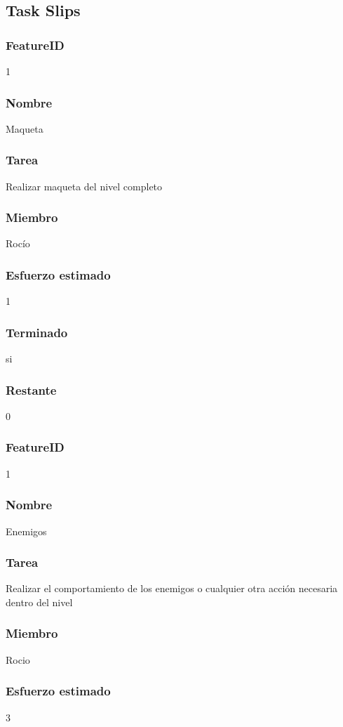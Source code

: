 \subsection{Task Slips}


\subsubsection{FeatureID}1
\subsubsection{Nombre}Maqueta
\subsubsection{Tarea}Realizar maqueta del nivel completo
\subsubsection{Miembro}Rocío
\subsubsection{Esfuerzo estimado}1
\subsubsection{Terminado}si
\subsubsection{Restante}0


\subsubsection{FeatureID} 1
\subsubsection{Nombre} Enemigos
\subsubsection{Tarea} Realizar el comportamiento de los enemigos o cualquier otra acción necesaria dentro del nivel
\subsubsection{Miembro} Rocio
\subsubsection{Esfuerzo estimado} 3

